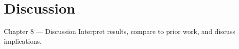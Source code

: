 \section{Discussion}

\begin{frame}{Chapter 8 — Discussion}
  Interpret results, compare to prior work, and discuss implications.
\end{frame}
